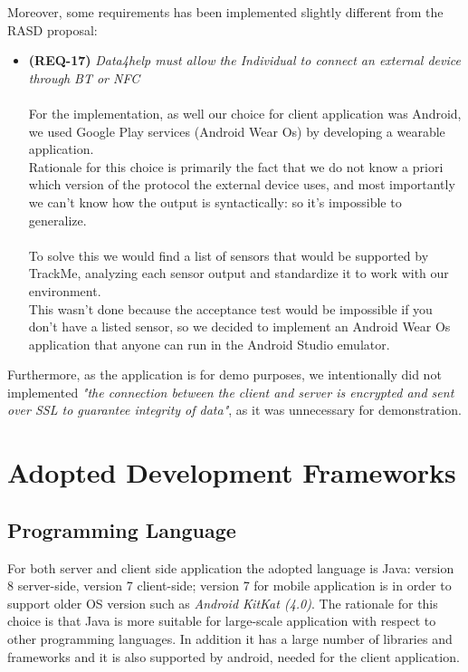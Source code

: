 \documentclass[a4paper]{article}
\begin{document}
Moreover, some requirements has been implemented slightly different from the RASD proposal:
\begin{itemize}
    \item \textbf{(REQ-17)} \textit{Data4help must allow the Individual to connect an external device through BT or NFC}\\\\
    For the implementation, as well our choice for client application was Android, we used Google Play services (Android Wear Os) by developing a wearable application.\\
    Rationale for this choice is primarily the fact that we do not know a priori which version of the protocol the external device uses, and most importantly we can't know how the output is syntactically: so it's impossible to generalize.\\\\
    To solve this we would find a list of sensors that would be supported by TrackMe, analyzing each sensor output and standardize it to work with our environment.\\
    This wasn't done because the acceptance test would be impossible if you don't have a listed sensor, so we decided to implement an Android Wear Os application that anyone can run in the Android Studio emulator.
\end{itemize}

Furthermore, as the application is for demo purposes, we intentionally did not implemented \textit{"the connection between the client and server is encrypted and sent over SSL to guarantee integrity of data"}, as it was unnecessary for demonstration.


\newpage
\section{Adopted Development Frameworks}

\subsection{Programming Language}
For both server and client side application the adopted language is Java: version 8 server-side, version 7 client-side; version 7 for mobile application is in order to support older OS version such as \textit{Android KitKat (4.0)}. The rationale for this choice is that Java is more suitable for large-scale application with respect to other programming languages. In addition it has a large number of libraries and frameworks and it is also supported by android, needed for the client application.
\end{document}
